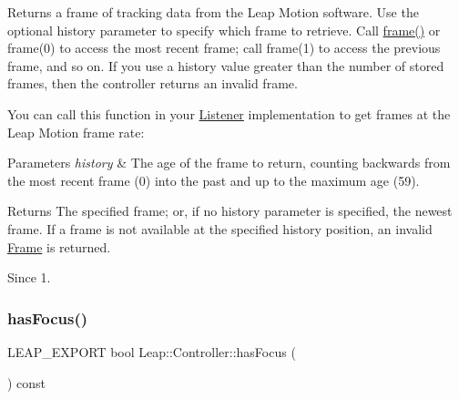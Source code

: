 Returns a frame of tracking data from the Leap Motion software. Use the optional history parameter to specify which frame to retrieve. Call \hyperlink{class_leap_1_1_controller_acb45e24fc2583045212f2cfec613f5b0}{frame()} or frame(0) to access the most recent frame; call frame(1) to access the previous frame, and so on. If you use a history value greater than the number of stored frames, then the controller returns an invalid frame.


\begin{DoxyCodeInclude}
\end{DoxyCodeInclude}


You can call this function in your \hyperlink{class_leap_1_1_listener}{Listener} implementation to get frames at the Leap Motion frame rate\+:


\begin{DoxyCodeInclude}
\end{DoxyCodeInclude}



\begin{DoxyParams}{Parameters}
{\em history} & The age of the frame to return, counting backwards from the most recent frame (0) into the past and up to the maximum age (59). \\
\hline
\end{DoxyParams}
\begin{DoxyReturn}{Returns}
The specified frame; or, if no history parameter is specified, the newest frame. If a frame is not available at the specified history position, an invalid \hyperlink{class_leap_1_1_frame}{Frame} is returned. 
\end{DoxyReturn}
\begin{DoxySince}{Since}
1. 
\end{DoxySince}
\mbox{\label{class_leap_1_1_controller_aa0e6ba72fc7f8c12137d6277548da0ec}} 
\subsubsection{\texorpdfstring{has\+Focus()}{hasFocus()}}
{\footnotesize\ttfamily L\+E\+A\+P\+\_\+\+E\+X\+P\+O\+RT bool Leap\+::\+Controller\+::has\+Focus (\begin{DoxyParamCaption}{ }\end{DoxyParamCaption}) const}

